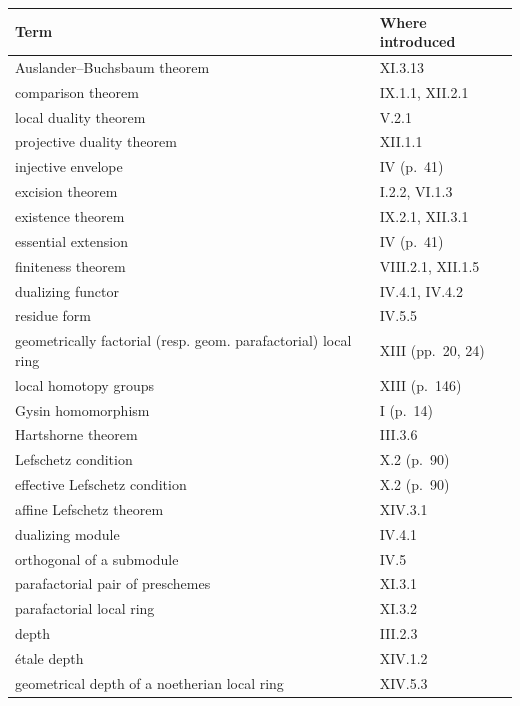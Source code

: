 \documentclass[
  11pt,
  a4paper,
]{book}
\newcounter{none} %
\begin{document}
{\def\LTcaptype{none} %
\begin{longtable}[]{@{}
  >{\raggedright\arraybackslash}p{}
  >{\raggedright\arraybackslash}p{}@{}}
\toprule\noalign{}
\begin{minipage}[b]{\linewidth}\raggedright
Term
\end{minipage} & \begin{minipage}[b]{\linewidth}\raggedright
Where introduced
\end{minipage} \\
\midrule\noalign{}
\endhead
\bottomrule\noalign{}
\endlastfoot
Auslander--Buchsbaum theorem & XI.3.13 \\
comparison theorem & IX.1.1, XII.2.1 \\
local duality theorem & V.2.1 \\
projective duality theorem & XII.1.1 \\
injective envelope & IV (p.~41) \\
excision theorem & I.2.2, VI.1.3 \\
existence theorem & IX.2.1, XII.3.1 \\
essential extension & IV (p.~41) \\
finiteness theorem & VIII.2.1, XII.1.5 \\
dualizing functor & IV.4.1, IV.4.2 \\
residue form & IV.5.5 \\
geometrically factorial (resp. geom. parafactorial) local ring & XIII
(pp.~20, 24) \\
local homotopy groups & XIII (p.~146) \\
Gysin homomorphism & I (p.~14) \\
Hartshorne theorem & III.3.6 \\
Lefschetz condition & X.2 (p.~90) \\
effective Lefschetz condition & X.2 (p.~90) \\
affine Lefschetz theorem & XIV.3.1 \\
dualizing module & IV.4.1 \\
orthogonal of a submodule & IV.5 \\
parafactorial pair of preschemes & XI.3.1 \\
parafactorial local ring & XI.3.2 \\
depth & III.2.3 \\
étale depth & XIV.1.2 \\
geometrical depth of a noetherian local ring & XIV.5.3 \\

\end{longtable}}
\end{document}
